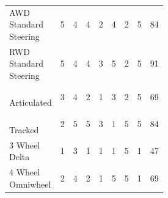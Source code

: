 \documentclass{article}
\begin{document}
\begin{table}[H]
\begin{adjustwidth}{-1in}{-1in}
\begin{tabular}{lcccccccc}
		\makecell[l]{AWD \\ Standard \\ Steering}                                 & 5     & 4                & 4         & 2                   & 4                 & 2                                          & 5                             & 84    \\ \hdashline
		\makecell[l]{RWD \\ Standard \\ Steering}                                 & 5     & 4                & 4         & 3                   & 5                 & 2                                          & 5                             & 91    \\ \hdashline
		\makecell[l]{ \\ Articulated \\ \quad }                                   & 3     & 4                & 2         & 1                   & 3                 & 2                                          & 5                             & 69    \\ \hdashline
		\makecell[l]{\\ Tracked  \\ \quad}                                        & 2     & 5                & 5         & 3                   & 1                 & 5                                          & 5                             & 84    \\ \hdashline
		\makecell[l]{3 Wheel \\ Delta}                                            & 1     & 3                & 1         & 1                   & 1                 & 5                                          & 1                             & 47    \\ \hdashline
		\makecell[l]{4 Wheel \\ Omniwheel}                                        & 2     & 4                & 2         & 1                   & 5                 & 5                                          & 1                             & 69    \\ 
		\end{tabular}
	
		\end{adjustwidth}
		\end{table}
		
\end{document}
